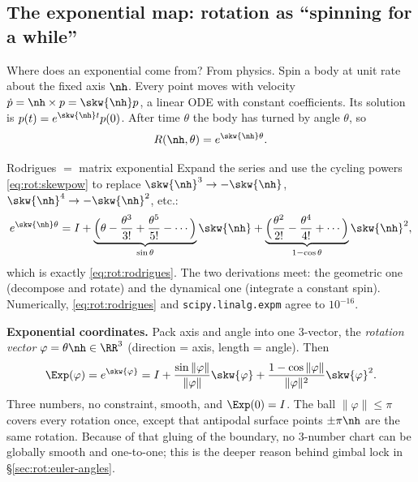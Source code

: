 \subsection{The exponential map: rotation as ``spinning for a while''}\label{sec:rot:exponential-map-rotation}
Where does an exponential come from? From physics. Spin a body at unit rate about the fixed axis $\nh$. Every point moves with velocity $\dot p=\nh\times p=\skw{\nh}p$, a linear ODE with constant coefficients. Its solution is $p(t)=e^{\skw{\nh}t}p(0)$. After time $\theta$ the body has turned by angle $\theta$, so
\[
R(\nh,\theta)=e^{\skw{\nh}\theta}.
\]
\begin{deriv}{Rodrigues $=$ matrix exponential}
Expand the series and use the cycling powers \eqref{eq:rot:skewpow} to replace $\skw{\nh}^3\to-\skw{\nh}$, $\skw{\nh}^4\to-\skw{\nh}^2$, etc.:
\[
e^{\skw{\nh}\theta}=I+\underbrace{\Big(\theta-\frac{\theta^3}{3!}+\frac{\theta^5}{5!}-\cdots\Big)}_{\sin\theta}\skw{\nh}+\underbrace{\Big(\frac{\theta^2}{2!}-\frac{\theta^4}{4!}+\cdots\Big)}_{1-\cos\theta}\skw{\nh}^2,
\]
which is exactly \eqref{eq:rot:rodrigues}. The two derivations meet: the geometric one (decompose and rotate) and the dynamical one (integrate a constant spin). Numerically, \eqref{eq:rot:rodrigues} and \texttt{scipy.linalg.expm} agree to $10^{-16}$.
\end{deriv}

\textbf{Exponential coordinates.} Pack axis and angle into one 3-vector, the \emph{rotation vector} $\varphi=\theta\nh\in\RR^3$ (direction = axis, length = angle). Then
\[
\Exp(\varphi)=e^{\skw{\varphi}}=I+\frac{\sin\|\varphi\|}{\|\varphi\|}\skw{\varphi}+\frac{1-\cos\|\varphi\|}{\|\varphi\|^2}\skw{\varphi}^2.
\]
Three numbers, no constraint, smooth, and $\Exp(0)=I$. The ball $\|\varphi\|\le\pi$ covers every rotation once, except that antipodal surface points $\pm\pi\nh$ are the same rotation. Because of that gluing of the boundary, no 3-number chart can be globally smooth and one-to-one; this is the deeper reason behind gimbal lock in \S\ref{sec:rot:euler-angles}.

